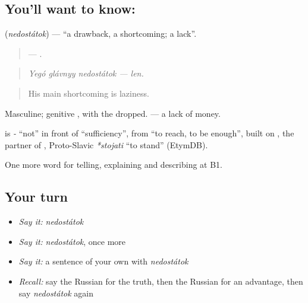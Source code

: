 \subsection*{You'll want to know: }
\textbf{} (\emph{nedostátok}) — \textquotedblleft{}a drawback, a shortcoming; a lack\textquotedblright{}.

\begin{quote}
   — .
\end{quote}

\begin{quote}
\emph{Yegó glávnyy nedostátok — len.}
\end{quote}

\begin{quote}
His main shortcoming is laziness.
\end{quote}

Masculine; genitive \emph{}, with the \emph{} dropped. \emph{ } — a lack of money.

\begin{cousinweb}
\textbf{} is \emph{-} \textquotedblleft{}not\textquotedblright{} in front of \emph{} \textquotedblleft{}sufficiency\textquotedblright{}, from \emph{} \textquotedblleft{}to reach, to be enough\textquotedblright{}, built on \emph{}, the partner of \emph{}, Proto-Slavic \emph{*stojati} \textquotedblleft{}to stand\textquotedblright{} (EtymDB).
\end{cousinweb}

\begin{grammarlens}[title={What you've built}]
One more word for telling, explaining and describing at B1.
\end{grammarlens}

\subsection*{Your turn}
\begin{itemize}
\raggedright
  \item \emph{Say it:} \emph{nedostátok}
  \item \emph{Say it:} \emph{nedostátok}, once more
  \item \emph{Say it:} a sentence of your own with \emph{nedostátok}
  \item \emph{Recall:} say the Russian for the truth, then the Russian for an advantage, then say \emph{nedostátok} again
\end{itemize}

